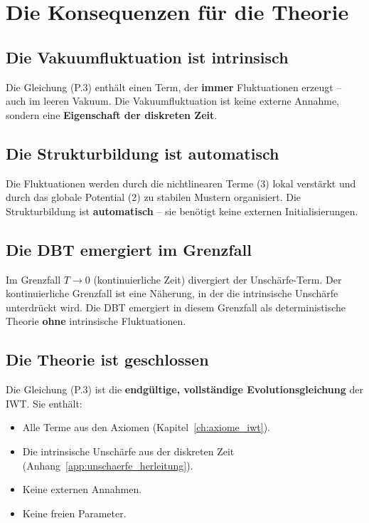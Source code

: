 \section{Die Konsequenzen für die Theorie}
\label{app:iwt_eq_konsequenzen}

\subsection{Die Vakuumfluktuation ist intrinsisch}

Die Gleichung (P.3) enthält einen Term, der \textbf{immer} Fluktuationen erzeugt – auch im leeren Vakuum. Die Vakuumfluktuation ist keine externe Annahme, sondern eine \textbf{Eigenschaft der diskreten Zeit}.

\subsection{Die Strukturbildung ist automatisch}

Die Fluktuationen werden durch die nichtlinearen Terme (3) lokal verstärkt und durch das globale Potential (2) zu stabilen Mustern organisiert. Die Strukturbildung ist \textbf{automatisch} – sie benötigt keine externen Initialisierungen.

\subsection{Die DBT emergiert im Grenzfall}

Im Grenzfall \( T \to 0 \) (kontinuierliche Zeit) divergiert der Unschärfe-Term. Der kontinuierliche Grenzfall ist eine Näherung, in der die intrinsische Unschärfe unterdrückt wird. Die DBT emergiert in diesem Grenzfall als deterministische Theorie \textbf{ohne} intrinsische Fluktuationen.

\subsection{Die Theorie ist geschlossen}

Die Gleichung (P.3) ist die \textbf{endgültige, vollständige Evolutionsgleichung} der IWT. Sie enthält:

\begin{itemize}
    \item Alle Terme aus den Axiomen (Kapitel~\ref{ch:axiome_iwt}).
    \item Die intrinsische Unschärfe aus der diskreten Zeit (Anhang~\ref{app:unschaerfe_herleitung}).
    \item Keine externen Annahmen.
    \item Keine freien Parameter.
\end{itemize}

